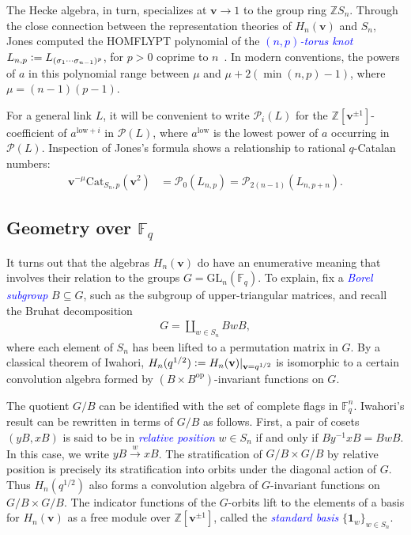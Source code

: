 \documentclass[submission]{FPSAC2025}
\newcommand{\dfemph}[1]{\textcolor{blue}{\emph{#1}}}
\newcommand{\m}{p}
\newcommand{\x}{\mathbf{v}}
\newcommand{\HOMFLYPT}{\mathcal{P}}
\newcommand{\Cat}{\mathrm{Cat}}
\begin{document}
The Hecke algebra, in turn, specializes at $\x \to 1$ to the group ring $\mathbb{Z}S_n$.
Through the close connection between the representation theories of $H_n(\x)$ and $S_n$, Jones computed the HOMFLYPT polynomial of the \dfemph{$(n, \m)$-torus knot} $L_{n, \m} \vcentcolon= L_{(\sigma_1 \cdots \sigma_{n - 1})^\m}$, for $\m > 0$ coprime to $n$~\cite{jones-v}.
In modern conventions, the powers of $a$ in this polynomial range between $\mu$ and $\mu + 2(\min(n, \m) - 1)$, where $\mu = (n - 1)(\m - 1)$.

For a general link $L$, it will be convenient to write $\HOMFLYPT_i(L)$ for the $\mathbb{Z}[\x^{\pm 1}]$-coefficient of $a^{\mathrm{low} + i}$ in $\HOMFLYPT(L)$, where $a^\mathrm{low}$ is the lowest power of $a$ occurring in $\HOMFLYPT(L)$.
Inspection of Jones's formula shows a relationship to rational $q$-Catalan numbers:
\begin{align}\label{eq:jones}
\x^{-\mu} \Cat_{S_n, \m}(\x^2)
	&= \HOMFLYPT_0(L_{n, \m})
	= \HOMFLYPT_{2(n - 1)}(L_{n, \m + n}).
\end{align}

\subsection{Geometry over $\mathbb{F}_q$}\label{subsec:geo}

It turns out that the algebras $H_n(\x)$ do have an enumerative meaning that involves their relation to the groups $G = \mathrm{GL}_n(\mathbb{F}_q)$.
To explain, fix a \dfemph{Borel subgroup} $B \subseteq G$, such as the subgroup of upper-triangular matrices, and recall the Bruhat decomposition
\begin{align}
G = \coprod_{w \in S_n} BwB,
\end{align}
where each element of $S_n$ has been lifted to a permutation matrix in $G$.
By a classical theorem of Iwahori, $H_n(q^{1/2}) \vcentcolon= H_n(\x)|_{\x = q^{1/2}}$ is isomorphic to a certain convolution algebra formed by $(B \times B^\mathrm{op})$-invariant functions on $G$.

The quotient $G/B$ can be identified with the set of complete flags in $\mathbb{F}_q^n$.
Iwahori's result can be rewritten in terms of $G/B$ as follows.
First, a pair of cosets $(yB, xB)$ is said to be in \dfemph{relative position} $w \in S_n$ if and only if $By^{-1}xB = BwB$.
In this case, we write $yB \xrightarrow{w} xB$.
The stratification of $G/B \times G/B$ by relative position is precisely its stratification into orbits under the diagonal action of $G$.
Thus $H_n(q^{1/2})$ also forms a convolution algebra of $G$-invariant functions on $G/B \times G/B$.
The indicator functions of the $G$-orbits lift to the elements of a basis for $H_n(\x)$ as a free module over $\mathbb{Z}[\x^{\pm 1}]$, called the \dfemph{standard basis} $\{\mathbf{1}_w\}_{w \in S_n}$.
\end{document}
